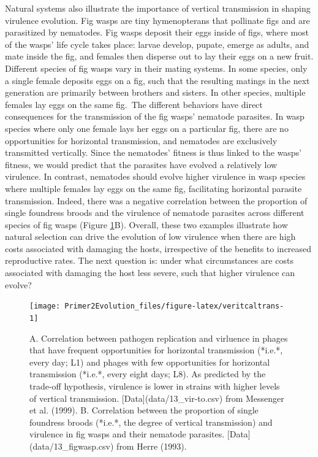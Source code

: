 \documentclass[
]{book}
\begin{document}
Natural systems also illustrate the importance of vertical transmission in shaping virulence evolution. Fig wasps are tiny hymenopterans that pollinate figs and are parasitized by nematodes. Fig wasps deposit their eggs inside of figs, where most of the wasps' life cycle takes place: larvae develop, pupate, emerge as adults, and mate inside the fig, and females then disperse out to lay their eggs on a new fruit. Different species of fig wasps vary in their mating systems. In some species, only a single female deposits eggs on a fig, such that the resulting matings in the next generation are primarily between brothers and sisters. In other species, multiple females lay eggs on the same fig.~The different behaviors have direct consequences for the transmission of the fig wasps' nematode parasites. In wasp species where only one female lays her eggs on a particular fig, there are no opportunities for horizontal transmission, and nematodes are exclusively transmitted vertically. Since the nematodes' fitness is thus linked to the wasps' fitness, we would predict that the parasites have evolved a relatively low virulence. In contrast, nematodes should evolve higher virulence in wasp species where multiple females lay eggs on the same fig, facilitating horizontal parasite transmission. Indeed, there was a negative correlation between the proportion of single foundress broods and the virulence of nematode parasites across different species of fig wasps (Figure \ref{fig:veritcaltrans}B). Overall, these two examples illustrate how natural selection can drive the evolution of low virulence when there are high costs associated with damaging the hosts, irrespective of the benefits to increased reproductive rates. The next question is: under what circumstances are costs associated with damaging the host less severe, such that higher virulence can evolve?

\begin{figure}
\texttt{[image: Primer2Evolution\_files/figure-latex/veritcaltrans-1]} \caption{A. Correlation between pathogen replication and virluence in phages that have frequent opportunities for horizontal transmission (*i.e.*, every day; L1) and phages with few opportunities for horizontal transmission (*i.e.*, every eight days; L8). As predicted by the trade-off hypothesis, virulence is lower in strains with higher levels of vertical transmission. [Data](data/13_vir-to.csv) from Messenger et al. (1999). B. Correlation between the proportion of single foundress broods (*i.e.*, the degree of vertical transmission) and virulence in fig wasps and their nematode parasites. [Data](data/13_figwasp.csv) from Herre (1993).}\label{fig:veritcaltrans}
\end{figure}
\end{document}
